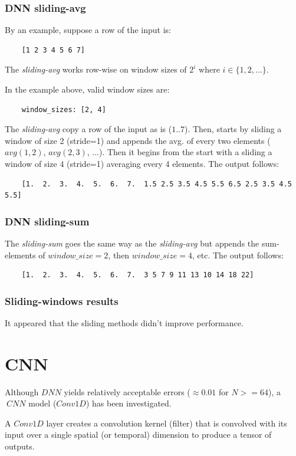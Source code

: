 \documentclass[a4paper, 12pt]{report}
\begin{document}
\subsubsection{DNN sliding-avg}
By an example, suppose a row of the input is:
\begin{verbatim}
    [1 2 3 4 5 6 7]
\end{verbatim}

The \textit{sliding-avg} works row-wise on window sizes of $2^i$ where $i \in \{1,2,...\}$.

In the example above, valid window sizes are:
\begin{verbatim}
    window_sizes: [2, 4]
\end{verbatim}

The \textit{sliding-avg} copy a row of the input as is ($1..7$). Then, starts by sliding a window of size 2 (stride=1) and appends the avg. of every two elements ($avg(1,2)$, $avg(2,3)$, ...). Then it begins from the start with a sliding a window of size 4 (stride=1) averaging every 4 elements. The output follows:
\begin{verbatim}
    [1.  2.  3.  4.  5.  6.  7.  1.5 2.5 3.5 4.5 5.5 6.5 2.5 3.5 4.5 5.5]
\end{verbatim}

\subsubsection{DNN sliding-sum}
The \textit{sliding-sum} goes the same way as the \textit{sliding-avg} but appends the sum-elements of $window\_size=2$, then $window\_size=4$, etc. The output follows:
\begin{verbatim}
    [1.  2.  3.  4.  5.  6.  7.  3 5 7 9 11 13 10 14 18 22]
\end{verbatim}

\subsubsection{Sliding-windows results}
It appeared that the sliding methods didn't improve performance.

\pagebreak
\section{CNN}
Although $DNN$ yields relatively acceptable errors ($\approx 0.01$ for $N>=64$), a $~CNN$ model ($Conv1D$) has been investigated.

A $Conv1D$ layer creates a convolution kernel (filter) that is convolved with its input over a single spatial (or temporal) dimension to produce a tensor of outputs.
\end{document}
